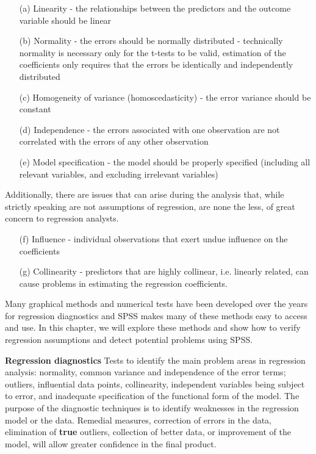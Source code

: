 \documentclass[12pt, a4paper]{report}
\begin{document}
\begin{itemize}

\item[(a)] Linearity - the relationships between the predictors and the outcome variable should be linear
\item[(b)]Normality - the errors should be normally distributed - technically normality is necessary only for the t-tests to be valid, estimation of the coefficients only requires that the errors be identically and independently distributed
\item[(c)]Homogeneity of variance (homoscedasticity) - the error variance should be constant
\item[(d)]Independence - the errors associated with one observation are not correlated with the errors of any other observation
\item[(e)]Model specification - the model should be properly specified (including all relevant variables, and excluding irrelevant variables)
\end{itemize}

Additionally, there are issues that can arise during the analysis that, while strictly speaking are not assumptions of regression, are none the less, of great concern to regression analysts.
\begin{itemize}
\item[(f)]Influence - individual observations that exert undue influence on the coefficients
\item[(g)]Collinearity - predictors that are highly collinear, i.e. linearly related, can cause problems in estimating the regression coefficients.
\end{itemize}
Many graphical methods and numerical tests have been developed over the years for regression diagnostics and SPSS makes many of these methods easy to access and use. In this chapter, we will explore these methods and show how to verify regression assumptions and detect potential problems using SPSS.






\textbf{Regression diagnostics} Tests to identify the main problem areas in regression analysis: normality, common variance and independence of the error terms; outliers, influential data points, collinearity, independent variables being subject to error, and inadequate specification of the functional form of the model. The purpose of the diagnostic techniques is to identify weaknesses in the regression model or the data. Remedial measures, correction of errors in the data, elimination of \textbf{true} outliers, collection of better data, or improvement of the model, will allow greater confidence in the final product.
\end{document}

